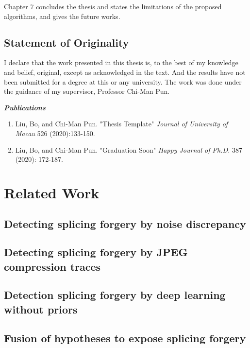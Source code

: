 \documentclass[a4paper, 12pt, twoside]{report}
\begin{document}
Chapter 7 concludes the thesis and states the limitations of the proposed algorithms, and gives the future works. 

\section{Statement of Originality}
I declare that the work presented in this thesis is, to the best of my knowledge and belief, original, except as acknowledged in the text. And the results have not been submitted for a degree at this or any university. The work was done under the guidance of my supervisor, Professor Chi-Man Pun.

\textbf{\textit{Publications}}
\begin{enumerate}
    \item Liu, Bo, and Chi-Man Pun. "Thesis Template" \textit{Journal of University of Macau} 526 (2020):133-150.
    \item Liu, Bo, and Chi-Man Pun. "Graduation Soon" \textit{Happy Journal of Ph.D.} 387 (2020): 172-187.
\end{enumerate}

\chapter{Related Work}
\lipsum[1]

\section{Detecting splicing forgery by noise discrepancy}
\lipsum[1]

\lipsum[2]

\section{Detecting splicing forgery by JPEG compression traces}
\lipsum[1]

\section{Detection splicing forgery by deep learning without priors}
\lipsum[2]

\section{Fusion of hypotheses to expose splicing forgery}
\lipsum[3]
\end{document}
